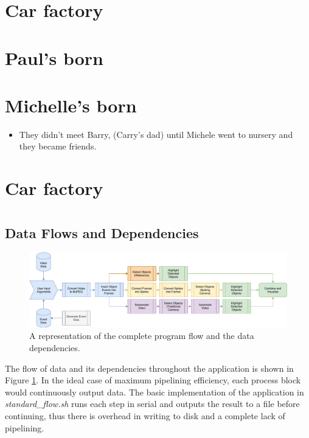 \documentclass[10pt,twocolumn,letterpaper]{article}
\newcommand{\code}{\textit}
\begin{document}
\section{Car factory}

\section{Paul's born}

\section{Michelle's born}

\begin{itemize}
    \item They didn't meet Barry, (Carry's dad) until Michele went to nursery and they became friends.
\end{itemize}

\section{Car factory}



\clearpage

\section{}
\subsection{Data Flows and Dependencies}

\begin{figure}
    \includegraphics[width=\textwidth]{process_diagram}
    \caption{A representation of the complete program flow and the data dependencies.}
    \label{fig:process_diagram}
\end{figure}

The flow of data and its dependencies throughout the application is shown in Figure \ref{fig:process_diagram}. In the ideal case of maximum pipelining efficiency, each process block would continuously output data. The basic implementation of the application in \code{standard\_flow.sh} runs each step in serial and outputs the result to a file before continuing, thus there is overhead in writing to disk and a complete lack of pipelining.
\end{document}
